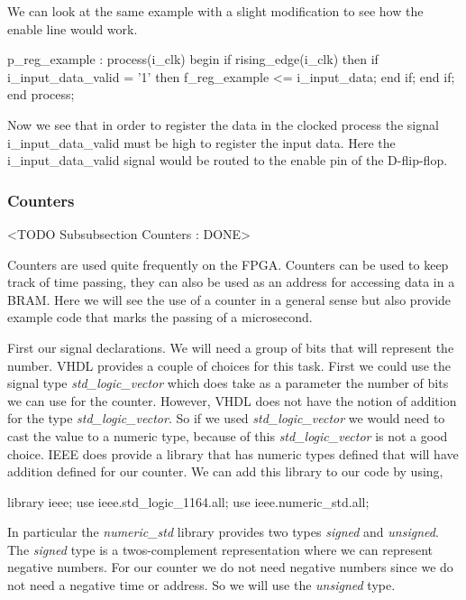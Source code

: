 We can look at the same example with a slight modification to see how the enable line would work.
	

\begin{VHDLlisting}[tabsize=4]
p_reg_example : process(i_clk)
begin
    if rising_edge(i_clk) then
        if i_input_data_valid = '1' then
            f_reg_example <= i_input_data;
        end if;
    end if;
end process;
\end{VHDLlisting}
	
Now we see that in order to register the data in the clocked process the signal i\_input\_data\_valid must be high to register the input data. Here the i\_input\_data\_valid signal would be routed to the enable pin of the D-flip-flop.
	
	
\subsubsection{Counters}
	<TODO Subsubsection  Counters : DONE>
	
Counters are used quite frequently on the \ac{FPGA}. Counters can be used to keep track of time passing, they can also be used as an address for accessing data in a \ac{BRAM}. Here we will see the use of a counter in a general sense but also provide example code that marks the passing of a microsecond. 

First our signal declarations. We will need a group of bits that will represent the number. \ac{VHDL} provides a couple of choices for this task. First we could use the signal type \emph{std\_logic\_vector} which does take as a parameter the number of bits we can use for the counter. However, \ac{VHDL} does not have the notion of addition for the type \emph{std\_logic\_vector}. So if we used \emph{std\_logic\_vector} we would need to cast the value to a numeric type, because of this \emph{std\_logic\_vector} is not a good choice. \ac{IEEE} does provide a library that has numeric types defined that will have addition defined for our counter. We can add this library to our code by using, 

\begin{VHDLlisting}[tabsize=4]
library ieee;
	use ieee.std_logic_1164.all;
	use ieee.numeric_std.all;
\end{VHDLlisting}

In particular the \emph{numeric\_std} library provides two types \emph{signed} and \emph{unsigned}. The \emph{signed} type is a twos-complement representation where we can represent negative numbers. For our counter we do not need negative numbers since we do not need a negative time or address. So we will use the \emph{unsigned} type. 


